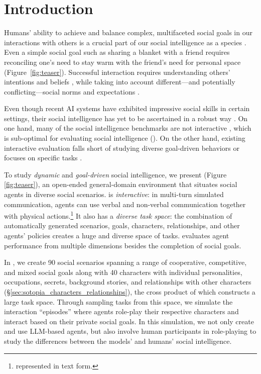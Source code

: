 \section{Introduction}
Humans' ability to achieve and balance complex, multifaceted social goals in our interactions with others is a crucial part of our social intelligence as a species \citep{kihlstrom_cantor_2020,Tomasello2021becoming}.
Even a simple social goal such as sharing a blanket with a friend requires reconciling one's need to stay warm with the friend's need for personal space %
(Figure~\ref{fig:teaser}).
Successful interaction requires understanding others' intentions and beliefs \citep{premack_woodruff_1978}, while taking into account different---and potentially conflicting---social norms and expectations \citep{Goffman2022-ko}.


Even though recent AI systems have exhibited impressive social skills in certain settings, their social intelligence has yet to be ascertained in a robust way \citep{shapira2023cleverHans, ullman2023large}.
On one hand, many of the social intelligence benchmarks are not interactive \citep{sap-etal-2019-social, le-etal-2019-revisiting, zadeh2019social}, which is sub-optimal for evaluating social intelligence (\citep{mehri-etal-2022-interactive, hoppler2022six, lee2023evaluating}). On the other hand, existing interactive evaluation falls short of studying diverse goal-driven behaviors \citep{zhang2018personalizing,Park2023GenerativeAI} or focuses on specific tasks \citep{wang-etal-2019-persuasion, padmakumar2022teach, cecero2022meta}.

To study \textit{dynamic} and \textit{goal-driven} social intelligence,
we present \sotopia (Figure \ref{fig:teaser}), an open-ended general-domain environment that situates social agents in diverse social scenarios.
\sotopia is \emph{interactive}: in multi-turn simulated communication, agents can use 
verbal and non-verbal communication together with physical actions.\footnote{represented in text form.} It also has a \emph{diverse task space}: the combination of automatically generated scenarios, goals, characters, relationships, and other agents' policies creates a huge and diverse space of tasks. \sotopia evaluates agent performance from multiple dimensions besides the completion of social goals. 


In \sotopia, we create 90 social scenarios spanning a range of cooperative, competitive, and mixed social goals along with 40 characters with individual personalities, occupations, secrets, background stories, and relationships with other characters (\S\ref{sec:sotopia_characters_relationships}), the cross product of which constructs a large task space.
Through sampling tasks from this space, we simulate the interaction ``episodes'' where agents role-play their respective characters and interact based on their private social goals. 
In this simulation, we not only create and use LLM-based agents, but also involve human participants in role-playing to study the differences between the models' and humans' social intelligence. 

